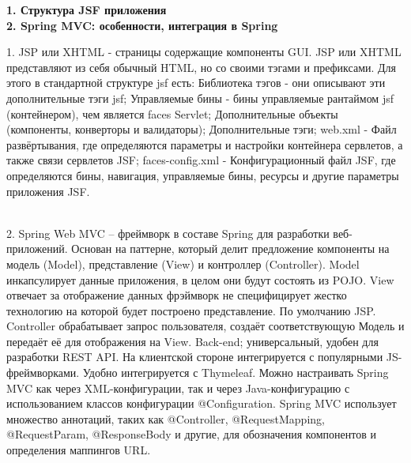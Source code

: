 \documentclass{article}
\newcommand{\bil}[4]{%
    \begin{minipage}{.3\textwidth}
        \textbf{1. #1} \\
        \textbf{2. #2}

        1. #3
        \\
        2. #4
    \end{minipage}
}
\begin{document}
\hfill
\bil{Структура JSF приложения}{Spring MVC: особенности, интеграция в Spring}{
    JSP или XHTML - страницы содержащие компоненты GUI. JSP или XHTML представляют из себя обычный HTML, но со своими тэгами и префиксами.
Для этого в стандартной структуре jsf есть:
Библиотека тэгов - они описывают эти дополнительные тэги jsf;
Управляемые бины - бины управляемые рантаймом jsf (контейнером), чем является faces Servlet;
Дополнительные объекты (компоненты, конверторы и валидаторы);
Дополнительные тэги;
web.xml - Файл развёртывания, где определяются параметры и настройки контейнера сервлетов, а также связи сервлетов JSF;
faces-config.xml - Конфигурационный файл JSF, где определяются бины, навигация, управляемые бины, ресурсы и другие параметры приложения JSF.
}{
    Spring Web MVC – фреймворк в составе Spring для разработки веб-приложений.
    Основан на паттерне, который делит предложение компоненты на модель (Model), представление (View) и контроллер (Controller).
    Model инкапсулирует данные приложения, в целом они будут состоять из POJO.
    View отвечает за отображение данных фрэймворк не специфицирует жестко технологию на которой будет построено представление. По умолчанию JSP.
    Controller обрабатывает запрос пользователя, создаёт соответствующую Модель и передаёт её для отображения на View.
Back-end; универсальный, удобен для разработки REST API. На клиентской стороне интегрируется с популярными JS-фреймворками.
Удобно интегрируется с Thymeleaf. Можно настраивать Spring MVC как через XML-конфигурации, так и через Java-конфигурацию с использованием классов конфигурации @Configuration.
Spring MVC использует множество аннотаций, таких как @Controller, @RequestMapping, @RequestParam, @ResponseBody и другие, для обозначения компонентов и определения маппингов URL.

}
\\
\end{document}
